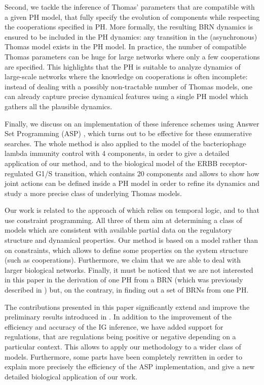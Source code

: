 Second, we tackle the inference of Thomas' parameters that are compatible with a given PH
model, \ie that fully specify the evolution of components while respecting the cooperations
specified in PH.
More formally, the resulting BRN dynamics is ensured to be included in the PH dynamics: any
transition in the (asynchronous) Thomas model exists in the PH model.
In practice, the number of compatible Thomas parameters can be huge for large networks where only a
few cooperations are specified.
This highlights that the PH is suitable to analyze dynamics of large-scale networks
where the knowledge on cooperations is often incomplete:
instead of dealing with a possibly non-tractable number of Thomas models, one can already capture
precise dynamical features using a single PH model which gathers all the plausible dynamics.

Finally, we discuss on an implementation of these inference schemes using Answer Set
Programming (ASP) \cite{Baral03},  which turns out to be effective for these enumerative searches.
The whole method is also applied to
the model of the bacteriophage lambda immunity control with 4 components,
in order to give a detailed application of our method,
and to the biological model of the ERBB receptor-regulated G1/S transition,
which contains 20 components
and allows to show how joint actions can be defined inside a PH model in order
to refine its dynamics and study a more precise class of underlying Thomas models.

Our work is related to the approach of \cite{Khalis09} which relies on temporal logic, and to \cite{20646302,DBLP:conf/ipcat/CorblinFTCT12} that use constraint programming.
All three of them aim at determining a class of models which are consistent with available partial data on the regulatory structure and dynamical properties.
Our method is based on a model rather than on constraints, which allows to define some properties on the system structure (such as cooperations).
Furthermore, we claim that we are able to deal with larger biological networks.
Finally, it must be noticed that we are not interested in this paper in the derivation of one PH
from a BRN (which was previously described in \cite{PMR10-TCSB}) but, on the contrary, in finding
out a set of BRNs from one PH.

The contributions presented in this paper significantly extend and improve the preliminary results
introduced in \cite{FPIMR12-CMSB}.
In addition to the improvement of the efficiency and accuracy of the IG inference, we have added support for
 regulations, that are regulations being positive or negative depending on a particular
context.
This allows to apply our methodology to a wider class of models.
Furthermore, some parts have been completely rewritten in order to explain more precisely the efficiency of the ASP implementation,
and give a new detailed biological application of our work.

